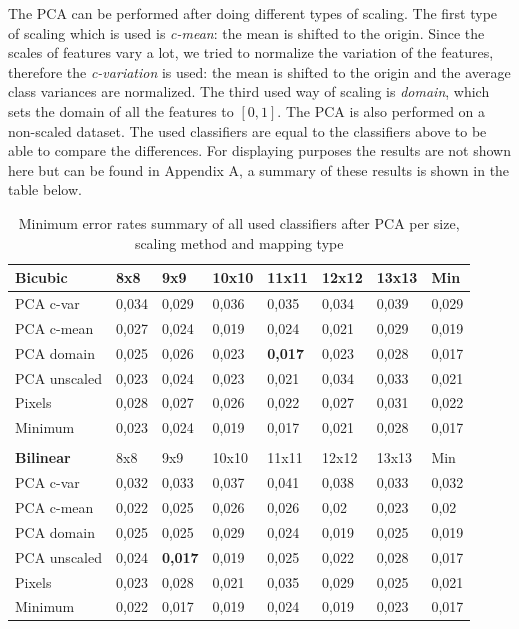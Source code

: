 \documentclass{article}
\begin{document}
The PCA can be performed after doing different types of scaling. The first type of scaling which is used is \emph{c-mean}: the mean is shifted to the origin. Since the scales of features vary a lot, we tried to normalize the variation of the features, therefore the \emph{c-variation} is used: the mean is shifted to the origin and the average class variances are normalized. The third used way of scaling is \emph{domain}, which sets the domain of all the features to $[0, 1]$. The PCA is also performed on a non-scaled dataset. The used classifiers are equal to the classifiers above to be able to compare the differences. For displaying purposes the results are not shown here but can be found in Appendix A, a summary of these results is shown in the table below.

\begin{table}[H]
  \small
  \centering
    \begin{tabular}{l|llllll|l|}
    \hline
    \textbf{Bicubic} & 8x8   & 9x9   & 10x10 & 11x11 & 12x12 & 13x13 & Min \\
    \hline \hline
    PCA c-var & 0,034 & 0,029 & 0,036 & 0,035 & 0,034 & 0,039 & 0,029 \\
    PCA c-mean & 0,027 & 0,024 & 0,019 & 0,024 & 0,021 & 0,029 & 0,019 \\
    PCA domain & 0,025 & 0,026 & 0,023 & \textbf{0,017} & 0,023 & 0,028 & 0,017 \\
    PCA unscaled & 0,023 & 0,024 & 0,023 & 0,021 & 0,034 & 0,033 & 0,021 \\ 
    Pixels & 0,028 & 0,027 & 0,026 & 0,022 & 0,027 & 0,031 & 0,022 \\ \hline
		Minimum   & 0,023 & 0,024 & 0,019 & 0,017 & 0,021 & 0,028 & 0,017 \\
		\hline \\
		\hline
    \textbf{Bilinear} & 8x8   & 9x9   & 10x10 & 11x11 & 12x12 & 13x13 & Min \\ \hline
    PCA c-var & 0,032 & 0,033 & 0,037 & 0,041 & 0,038 & 0,033 & 0,032 \\
    PCA c-mean & 0,022 & 0,025 & 0,026 & 0,026 & 0,02  & 0,023 & 0,02 \\
    PCA domain & 0,025 & 0,025 & 0,029 & 0,024 & 0,019 & 0,025 & 0,019 \\
    PCA unscaled & 0,024 & \textbf{0,017} & 0,019 & 0,025 & 0,022 & 0,028 & 0,017 \\
    Pixels & 0,023 & 0,028 & 0,021 & 0,035 & 0,029 & 0,025 & 0,021 \\ \hline
		Minimum & 0,022 & 0,017 & 0,019 & 0,024 & 0,019 & 0,023 & 0,017 \\ 
    \hline
    \end{tabular}%
    \caption{Minimum error rates summary of all used classifiers after PCA per size, scaling method and mapping type} \label{table: error rate summary PCA}%
\end{table}%
\end{document}
